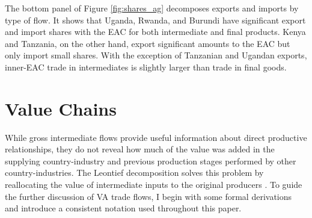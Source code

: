 \documentclass[a4paper]{article}
\begin{document}
The bottom panel of Figure \ref{fig:shares_ag} decomposes exports and imports by type of flow. It shows that Uganda, Rwanda, and Burundi have significant export and import shares with the EAC for both intermediate and final products. Kenya and Tanzania, on the other hand, export significant amounts to the EAC but only import small shares. With the exception of Tanzanian and Ugandan exports, inner-EAC trade in intermediates is slightly larger than trade in final goods. 



\section{Value Chains}

While gross intermediate flows provide useful information about direct productive relationships, they do not reveal how much of the value was added in the supplying country-industry and previous production stages performed by other country-industries. The Leontief decomposition solves this problem by reallocating the value of intermediate inputs to the original producers \citep{Kummritz2014}. To guide the further discussion of VA trade flows, I begin with some formal derivations and introduce a consistent notation used throughout this paper. \newline
\end{document}
